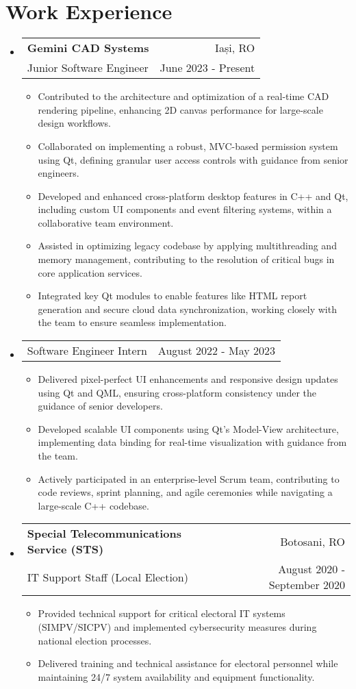 \documentclass[a4paper,11pt]{article}
\makeatletter
\newcommand{\resumeItem}[1]{\item\small{#1\vspace{-2pt}}}
\newcommand{\resumeSubheading}[4]{
  \vspace{-1pt}\item
    \begin{tabular*}{0.97\textwidth}{l@{\extracolsep{\fill}}r}
      \color{NavyBlue}\textbf{#1} & #2 \\
      #3 & #4 \\
    \end{tabular*}\vspace{-5pt}
}
\newcommand{\resumeSubheadingSimple}[2]{
  \vspace{-1pt}\item
    \begin{tabular*}{0.97\textwidth}{l@{\extracolsep{\fill}}r}
      #1 & #2 \\
    \end{tabular*}\vspace{-5pt}
}
\newcommand{\resumeSubHeadingListStart}{\begin{itemize}[leftmargin=*, label={}]}
\newcommand{\resumeSubHeadingListEnd}{\end{itemize}}
\newcommand{\resumeItemListStart}{\begin{itemize}}
\newcommand{\resumeItemListEnd}{\end{itemize}\vspace{-5pt}}
\makeatother
\begin{document}
\section{Work Experience}
  \resumeSubHeadingListStart
    \resumeSubheading{Gemini CAD Systems}{Iași, RO}
    {Junior Software Engineer}{June 2023 - Present}
    \resumeItemListStart
        \resumeItem{Contributed to the architecture and optimization of a real-time CAD rendering pipeline, enhancing 2D canvas performance for large-scale design workflows.}
        \resumeItem{Collaborated on implementing a robust, MVC-based permission system using Qt, defining granular user access controls with guidance from senior engineers.}
        \resumeItem{Developed and enhanced cross-platform desktop features in C++ and Qt, including custom UI components and event filtering systems, within a collaborative team environment.}
        \resumeItem{Assisted in optimizing legacy codebase by applying multithreading and memory management, contributing to the resolution of critical bugs in core application services.}
        \resumeItem{Integrated key Qt modules to enable features like HTML report generation and secure cloud data synchronization, working closely with the team to ensure seamless implementation.}
    \resumeItemListEnd
    \resumeSubheadingSimple
    {Software Engineer Intern}{August 2022 - May 2023}
    \resumeItemListStart
        \resumeItem{Delivered pixel-perfect UI enhancements and responsive design updates using Qt and QML, ensuring cross-platform consistency under the guidance of senior developers.}
        \resumeItem{Developed scalable UI components using Qt's Model-View architecture, implementing data binding for real-time visualization with guidance from the team.}
        \resumeItem{Actively participated in an enterprise-level Scrum team, contributing to code reviews, sprint planning, and agile ceremonies while navigating a large-scale C++ codebase.}
    \resumeItemListEnd
    \resumeSubheading{Special Telecommunications Service (STS)}{Botosani, RO}
    {IT Support Staff (Local Election)}{August 2020 - September 2020}
    \resumeItemListStart
         \resumeItem{Provided technical support for critical electoral IT systems (SIMPV/SICPV) and implemented cybersecurity measures during national election processes.}
        \resumeItem{Delivered training and technical assistance for electoral personnel while maintaining 24/7 system availability and equipment functionality.}
    \resumeItemListEnd
\resumeSubHeadingListEnd
\end{document}
